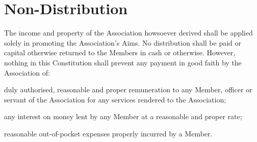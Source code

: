\documentclass[10pt]{mk-articles-of-association}
\begin{document}

\section{Non-Distribution}

  The income and property of the Association howsoever derived shall be
  applied solely in promoting the Association’s Aims. No distribution shall
  be paid or capital otherwise returned to the Members in cash or otherwise.
  However, nothing in this Constitution shall prevent any payment in good
  faith by the Association of:
  \begin{constenum}
  \item duly authorised, reasonable and proper remuneration to any Member,
    officer or servant of the Association for any services rendered to the
    Association;
  \item any interest on money lent by any Member at a reasonable and proper
    rate; \ITor
  \item reasonable out-of-pocket expenses properly incurred by a Member.
  \end{constenum}


\end{document}

